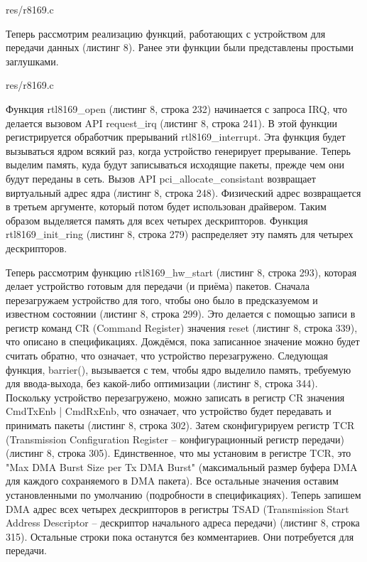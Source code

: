 \newpage


{res/r8169.c}

Теперь рассмотрим реализацию функций, работающих с устройством для передачи данных (листинг 8). Ранее эти функции были представлены простыми заглушками.


{res/r8169.c}

Функция rtl8169\_open (листинг 8, строка 232) начинается с запроса IRQ, что делается вызовом API request\_irq (листинг 8, строка 241). В этой функции регистрируется обработчик прерываний rtl8169\_interrupt. Эта функция будет вызываться ядром всякий раз, когда устройство генерирует прерывание. Теперь выделим память, куда будут записываться исходящие пакеты, прежде чем они будут переданы в сеть. Вызов API pci\_allocate\_consistant возвращает виртуальный адрес ядра (листинг 8, строка 248). Физический адрес возвращается в третьем аргументе, который потом будет использован драйвером. Таким образом выделяется память для всех четырех дескрипторов. Функция rtl8169\_init\_ring (листинг 8, строка 279) распределяет эту память для четырех дескрипторов.

Теперь рассмотрим функцию rtl8169\_hw\_start (листинг 8, строка 293), которая делает устройство готовым для передачи (и приёма) пакетов. Сначала перезагружаем устройство для того, чтобы оно было в предсказуемом и известном состоянии (листинг 8, строка 299). Это делается с помощью записи в регистр команд CR (Command Register) значения reset (листинг 8, строка 339), что описано в спецификациях. Дождёмся, пока записанное значение можно будет считать обратно, что означает, что устройство перезагружено. Следующая функция, barrier(), вызывается с тем, чтобы ядро выделило память, требуемую для ввода-выхода, без какой-либо оптимизации (листинг 8, строка 344). Поскольку устройство перезагружено, можно записать в регистр CR значения CmdTxEnb | CmdRxEnb, что означает, что устройство будет передавать и принимать пакеты (листинг 8, строка 302). Затем сконфигурируем регистр TCR (Transmission Configuration Register -- конфигурационный регистр передачи) (листинг 8, строка 305). Единственное, что мы установим в регистре TCR, это "Max DMA Burst Size per Tx DMA Burst" (максимальный размер буфера DMA для каждого сохраняемого в DMA пакета). Все остальные значения оставим установленными по умолчанию (подробности в спецификациях). Теперь запишем DMA адрес всех четырех дескрипторов в регистры TSAD (Transmission Start Address Descriptor – дескриптор начального адреса передачи) (листинг 8, строка 315). Остальные строки пока останутся без комментариев. Они потребуется для передачи.

